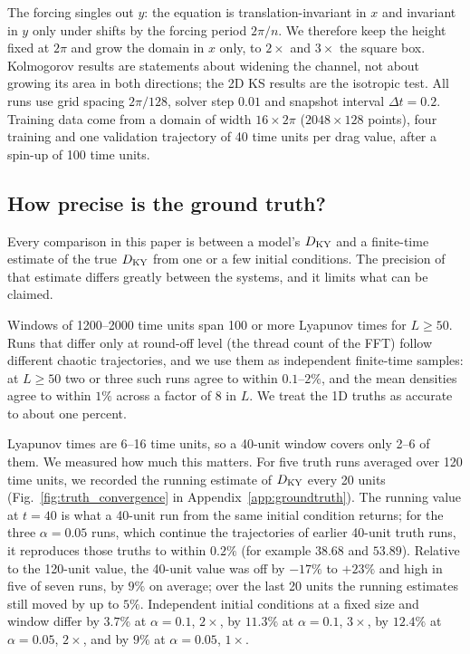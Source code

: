 The forcing singles out $y$: the equation is translation-invariant in
$x$ and invariant in $y$ only under shifts by the forcing period $2\pi/n$.
We therefore keep the height fixed at $2\pi$ and grow the domain in $x$
only, to $2\times$ and $3\times$ the square box. Kolmogorov results are
statements about widening the channel, not about growing its area in
both directions; the 2D KS results are the isotropic test. All runs use
grid spacing $2\pi/128$, solver step $0.01$ and snapshot interval
$\Delta t=0.2$. Training data come from a domain of width $16\times2\pi$
($2048\times128$ points), four training and one validation trajectory of
40 time units per drag value, after a spin-up of 100 time units.

\subsection{How precise is the ground truth?}
\label{sec:truth_uncertainty}

Every comparison in this paper is between a model's $D_{\mathrm{KY}}$ and a
finite-time estimate of the true $D_{\mathrm{KY}}$ from one or a few initial
conditions. The precision of that estimate differs greatly between the
systems, and it limits what can be claimed.

 Windows of 1200--2000 time units span 100 or more
Lyapunov times for $L\ge50$. Runs that differ only at round-off level
(the thread count of the FFT) follow different chaotic trajectories, and
we use them as independent finite-time samples: at $L\ge50$ two or
three such runs agree to within $0.1$--$2\%$, and the mean densities
agree to within $1\%$ across a factor of 8 in $L$. We treat the 1D
truths as accurate to about one percent.

 Lyapunov times are 6--16 time units, so a
40-unit window covers only 2--6 of them. We measured how much this
matters. For five truth runs averaged over 120 time units, we recorded
the running estimate of $D_{\mathrm{KY}}$ every 20 units
(Fig.~\ref{fig:truth_convergence} in Appendix~\ref{app:groundtruth}).
The running value at $t=40$ is what a 40-unit run from the same
initial condition returns; for the three $\alpha=0.05$ runs, which
continue the trajectories of earlier 40-unit truth runs, it reproduces
those truths to within $0.2\%$ (for example $38.68$ and $53.89$).
Relative to the 120-unit value, the 40-unit value was off by $-17\%$ to
$+23\%$ and high in five of seven runs, by $9\%$ on average;
over the last 20 units the running estimates still moved by up to
$5\%$. Independent initial conditions at a fixed size and window
differ by $3.7\%$ at $\alpha=0.1$, $2\times$, by $11.3\%$ at $\alpha=0.1$,
$3\times$, by $12.4\%$ at
$\alpha=0.05$, $2\times$, and by $9\%$ at $\alpha=0.05$, $1\times$.

